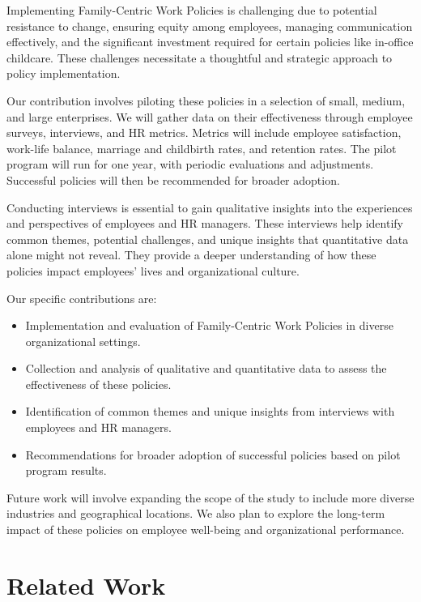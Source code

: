 \documentclass{article} %
\begin{document}
Implementing Family-Centric Work Policies is challenging due to potential resistance to change, ensuring equity among employees, managing communication effectively, and the significant investment required for certain policies like in-office childcare. These challenges necessitate a thoughtful and strategic approach to policy implementation.

Our contribution involves piloting these policies in a selection of small, medium, and large enterprises. We will gather data on their effectiveness through employee surveys, interviews, and HR metrics. Metrics will include employee satisfaction, work-life balance, marriage and childbirth rates, and retention rates. The pilot program will run for one year, with periodic evaluations and adjustments. Successful policies will then be recommended for broader adoption.

Conducting interviews is essential to gain qualitative insights into the experiences and perspectives of employees and HR managers. These interviews help identify common themes, potential challenges, and unique insights that quantitative data alone might not reveal. They provide a deeper understanding of how these policies impact employees' lives and organizational culture.

Our specific contributions are:
\begin{itemize}
    \item Implementation and evaluation of Family-Centric Work Policies in diverse organizational settings.
    \item Collection and analysis of qualitative and quantitative data to assess the effectiveness of these policies.
    \item Identification of common themes and unique insights from interviews with employees and HR managers.
    \item Recommendations for broader adoption of successful policies based on pilot program results.
\end{itemize}

Future work will involve expanding the scope of the study to include more diverse industries and geographical locations. We also plan to explore the long-term impact of these policies on employee well-being and organizational performance.

\section{Related Work}
\label{sec:related}
\end{document}
